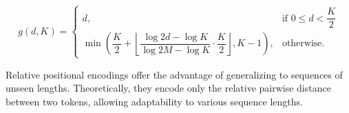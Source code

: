 \begin{equation}
    g(d, K) = 
    \begin{cases}
        d, & \text{if } 0 \leq d < \dfrac{K}{2} \\
        \min \left(\dfrac{K}{2} + \left\lfloor \dfrac{\log 2d - \log K}{\log 2M - \log K} \cdot \dfrac{K}{2}\right\rfloor, K-1 \right), & \text{otherwise.}
    \end{cases}
\end{equation}








Relative positional encodings offer the advantage of generalizing to sequences of unseen lengths. Theoretically, they encode only the relative pairwise distance between two tokens, allowing adaptability to various sequence lengths.

